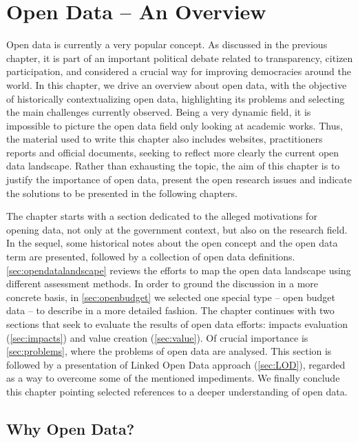 \chapter{Open Data -- An Overview}
\label{chap:opendata}

Open data is currently a very popular concept.
As discussed in the previous chapter, it is part of an important political debate related to transparency, citizen participation, and considered a crucial way for improving democracies around the world.
In this chapter, we drive an overview about open data, with the objective of historically contextualizing open data, highlighting its problems and selecting the main challenges currently observed.
Being a very dynamic field, it is impossible to picture the open data field only looking at academic works.
Thus, the material used to write this chapter also includes websites, practitioners reports and official documents, seeking to reflect more clearly the current open data landscape.
Rather than exhausting the topic, the aim of this chapter is to justify the importance of open data, present the open research issues and indicate the solutions to be presented in the following chapters.

The chapter starts with a section dedicated to the alleged motivations for opening data, not only at the government context, but also on the research field.
In the sequel, some historical notes about the open concept and the open data term are presented, followed by a collection of open data definitions.
\autoref{sec:opendatalandscape} reviews the efforts to map the open data landscape using different assessment methods.
In order to ground the discussion in a more concrete basis, in \autoref{sec:openbudget} we selected one special type -- open budget data -- to describe in a more detailed fashion.
The chapter continues with two sections that seek to evaluate the results of open data efforts: impacts evaluation (\autoref{sec:impacts}) and value creation (\autoref{sec:value}).
Of crucial importance is \autoref{sec:problems}, where the problems of open data are analysed.
This section is followed by a presentation of Linked Open Data approach (\autoref{sec:LOD}), regarded as a way to overcome some of the mentioned impediments.
We finally conclude this chapter pointing selected references to a deeper understanding of open data. 

\section{Why Open Data?}
\label{sec:why}

